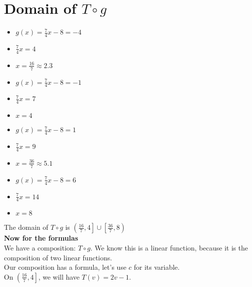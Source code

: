 \documentclass{ximera}
\begin{document}
\section{Domain of $T \circ g$}




\begin{itemize}
\item $g(x) = \frac{7}{4}x -8 = -4$
\item $\frac{7}{4}x = 4$
\item $x = \frac{16}{7} \approx 2.3$
\end{itemize}



\begin{itemize}
\item $g(x) = \frac{7}{4}x -8 = -1$
\item $\frac{7}{4}x = 7$
\item $x = 4$
\end{itemize}


\begin{itemize}
\item $g(x) = \frac{7}{4}x -8 = 1$
\item $\frac{7}{4}x = 9$
\item $x = \frac{36}{7} \approx 5.1$
\end{itemize}


\begin{itemize}
\item $g(x) = \frac{7}{4}x -8 = 6$
\item $\frac{7}{4}x = 14$
\item $x = 8$
\end{itemize}



The domain of $T \circ g$ is $\left(\frac{16}{7}, 4\right] \cup \left[\frac{36}{7}, 8\right)$ \\


\textbf{Now for the formulas} \\


We have a composition: $T \circ g$.  We know this is a linear function, because it is the composition of two linear functions. \\

Our composition has a formula, let's use $c$ for its variable. \\


On $\left(\frac{16}{7}, 4\right]$, we will have $T(v) = 2v - 1$.  \\
\end{document}
